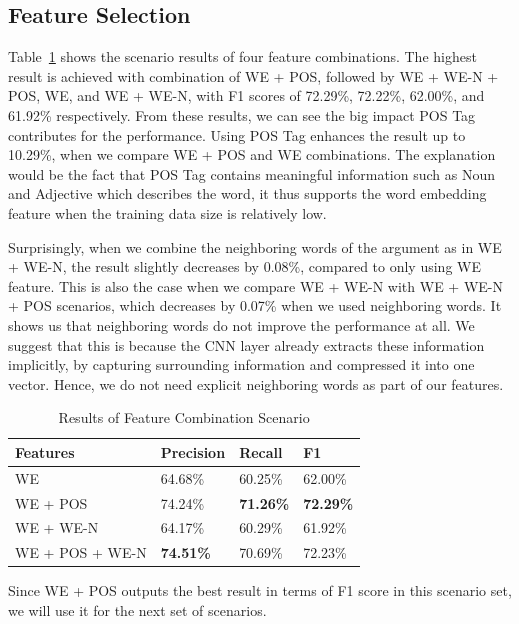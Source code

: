 \subsection{Feature Selection}
Table~\ref{tab:feature_scenario} shows the scenario results of four feature combinations. The highest result is achieved with combination of WE + POS, followed by WE + WE-N + POS, WE, and WE + WE-N, with F1 scores of 72.29\%, 72.22\%, 62.00\%, and 61.92\% respectively. From these results, we can see the big impact POS Tag contributes for the performance. Using POS Tag enhances the result up to 10.29\%, when we compare WE + POS and WE combinations. The explanation would be the fact that POS Tag contains meaningful information such as Noun and Adjective which describes the word, it thus supports the word embedding feature when the training data size is relatively low.

Surprisingly, when we combine the neighboring words of the argument as in WE + WE-N, the result slightly decreases by 0.08\%, compared to only using WE feature. This is also the case when we compare WE + WE-N with WE + WE-N + POS scenarios, which decreases by 0.07\% when we used neighboring words. It shows us that neighboring words do not improve the performance at all. We suggest that this is because the CNN layer already extracts these information implicitly, by capturing surrounding information and compressed it into one vector. Hence, we do not need explicit neighboring words as part of our features. 

\begin{table}
	\caption{Results of Feature Combination Scenario}
	\label{tab:feature_scenario}
	\begin{tabular}{llll}
		\toprule
		Features		&Precision	&Recall		&F1			\\
		\midrule
		WE				&	64.68\%				&	60.25\%				&	62.00\%	\\
		WE + POS		&	74.24\%				&	\textbf{71.26\%}	&	\textbf{72.29\%}	\\
		WE + WE-N		&	64.17\%				&	60.29\%				&	61.92\%	\\
		WE + POS + WE-N	&	\textbf{74.51\%}	&	70.69\%				&	72.23\%	\\
		\bottomrule
	\end{tabular}
\end{table}

Since WE + POS outputs the best result in terms of F1 score in this scenario set, we will use it for the next set of scenarios.

